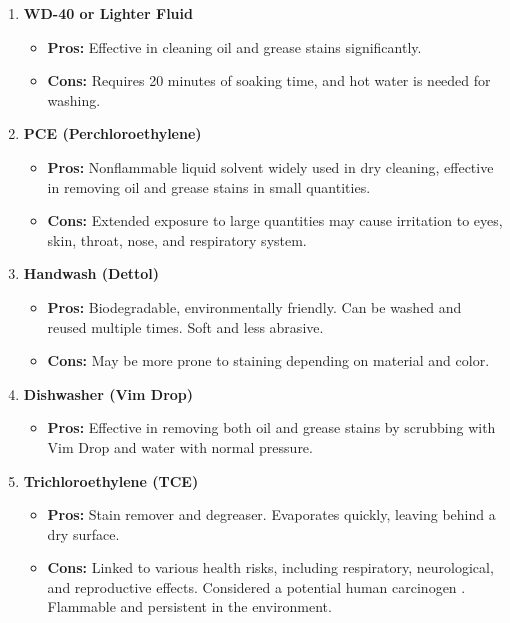 \documentclass[table]{rapportCS}
\begin{document}
\begin{enumerate}
    \item \textbf{WD-40 or Lighter Fluid}
    \begin{itemize}[label=$\bullet$]
        \item \textbf{Pros:} Effective in cleaning oil and grease stains significantly.
        \item \textbf{Cons:} Requires 20 minutes of soaking time, and hot water is needed for washing.
    \end{itemize}

    \item \textbf{PCE (Perchloroethylene)}
    \begin{itemize}[label=$\bullet$]
        \item \textbf{Pros:} Nonflammable liquid solvent widely used in dry cleaning, effective in removing oil and grease stains in small quantities.
        \item \textbf{Cons:} Extended exposure to large quantities may cause irritation to eyes, skin, throat, nose, and respiratory system.
    \end{itemize}

    \item \textbf{Handwash (Dettol)}
    \begin{itemize}[label=$\bullet$]
        \item \textbf{Pros:} Biodegradable, environmentally friendly. Can be washed and reused multiple times. Soft and less abrasive.
        \item \textbf{Cons:} May be more prone to staining depending on material and color.
    \end{itemize}

    \item \textbf{Dishwasher (Vim Drop)}
    \begin{itemize}[label=$\bullet$]
        \item \textbf{Pros:} Effective in removing both oil and grease stains by scrubbing with Vim Drop and water with normal pressure.
    \end{itemize}

    \item \textbf{Trichloroethylene (TCE)}
    \begin{itemize}[label=$\bullet$]
        \item \textbf{Pros:} Stain remover and degreaser. Evaporates quickly, leaving behind a dry surface.
        \item \textbf{Cons:} Linked to various health risks, including respiratory, neurological, and reproductive effects. Considered a potential human carcinogen . Flammable and persistent in the environment.
    \end{itemize}


\end{enumerate}
\end{document}
